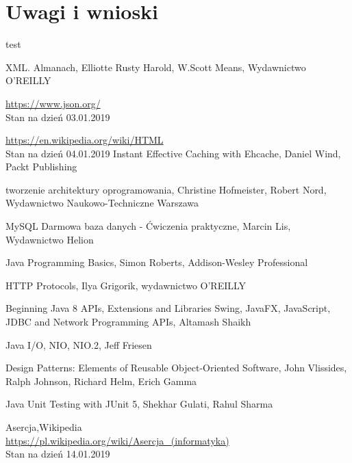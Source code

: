 \documentclass[12pt, twoside]{report}
\begin{document}
\chapter{Uwagi i wnioski}
test
\begin{thebibliography}{9}
XML. Almanach, Elliotte Rusty Harold, W.Scott Means, Wydawnictwo O'REILLY

  \url{https://www.json.org/} \\
  Stan na dzień 03.01.2019

	\url{https://en.wikipedia.org/wiki/HTML} \\
	Stan na dzień 04.01.2019
Instant Effective Caching with Ehcache, Daniel Wind, Packt Publishing


tworzenie architektury oprogramowania, Christine Hofmeister, Robert Nord, Wydawnictwo Naukowo-Techniczne Warszawa

MySQL Darmowa baza danych - Ćwiczenia praktyczne, Marcin Lis, Wydawnictwo Helion

Java Programming Basics, Simon Roberts, Addison-Wesley Professional

HTTP Protocols, Ilya Grigorik, wydawnictwo O'REILLY

Beginning Java 8 APIs, Extensions and Libraries Swing, JavaFX, JavaScript, JDBC and Network Programming APIs, Altamash Shaikh

Java I/O, NIO, NIO.2, Jeff Friesen

Design Patterns: Elements of Reusable Object-Oriented Software, John Vlissides, Ralph Johnson, Richard Helm, Erich Gamma

Java Unit Testing with JUnit 5, Shekhar Gulati, Rahul Sharma

Asercja,Wikipedia \\
\url{https://pl.wikipedia.org/wiki/Asercja_(informatyka)} \\
Stan na dzień 14.01.2019

\end{thebibliography}
\end{document}
